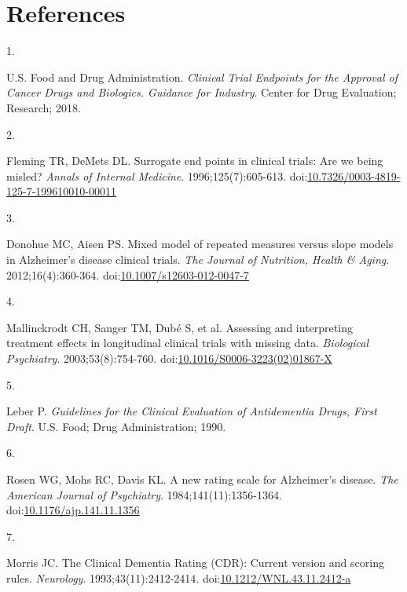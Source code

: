 \documentclass[
  11pt,
]{article}
\newlength{\cslhangindent}
\newlength{\csllabelwidth}
\newenvironment{CSLReferences}[2] %
 {\begin{list}{}{%
  \setlength{\itemindent}{0pt}
  \setlength{\leftmargin}{0pt}
  \setlength{\parsep}{0pt}
  \ifodd #1
   \setlength{\leftmargin}{\cslhangindent}
   \setlength{\itemindent}{-1\cslhangindent}
  \fi
  \setlength{\itemsep}{#2\baselineskip}}}
 {\end{list}}
\newcommand{\CSLLeftMargin}[1]{\parbox[t]{\csllabelwidth}{\strut#1\strut}}
\newcommand{\CSLRightInline}[1]{\parbox[t]{\linewidth - \csllabelwidth}{\strut#1\strut}}
\begin{document}
\section*{References}\label{references}

\protect{}\label{refs}
\begin{CSLReferences}{0}{1}
\CSLLeftMargin{1. }%
\CSLRightInline{U.S. Food and Drug Administration. \emph{Clinical Trial Endpoints for the Approval of Cancer Drugs and Biologics. Guidance for Industry}. Center for Drug Evaluation; Research; 2018.}

\CSLLeftMargin{2. }%
\CSLRightInline{Fleming TR, DeMets DL. Surrogate end points in clinical trials: Are we being misled? \emph{Annals of Internal Medicine}. 1996;125(7):605-613. doi:\href{https://doi.org/10.7326/0003-4819-125-7-199610010-00011}{10.7326/0003-4819-125-7-199610010-00011}}

\CSLLeftMargin{3. }%
\CSLRightInline{Donohue MC, Aisen PS. Mixed model of repeated measures versus slope models in {Alzheimer's} disease clinical trials. \emph{The Journal of Nutrition, Health \& Aging}. 2012;16(4):360-364. doi:\href{https://doi.org/10.1007/s12603-012-0047-7}{10.1007/s12603-012-0047-7}}

\CSLLeftMargin{4. }%
\CSLRightInline{Mallinckrodt CH, Sanger TM, Dubé S, et al. Assessing and interpreting treatment effects in longitudinal clinical trials with missing data. \emph{Biological Psychiatry}. 2003;53(8):754-760. doi:\href{https://doi.org/10.1016/S0006-3223(02)01867-X}{10.1016/S0006-3223(02)01867-X}}

\CSLLeftMargin{5. }%
\CSLRightInline{Leber P. \emph{Guidelines for the Clinical Evaluation of Antidementia Drugs, First Draft}. U.S. Food; Drug Administration; 1990.}

\CSLLeftMargin{6. }%
\CSLRightInline{Rosen WG, Mohs RC, Davis KL. A new rating scale for {Alzheimer's} disease. \emph{The American Journal of Psychiatry}. 1984;141(11):1356-1364. doi:\href{https://doi.org/10.1176/ajp.141.11.1356}{10.1176/ajp.141.11.1356}}

\CSLLeftMargin{7. }%
\CSLRightInline{Morris JC. The {Clinical Dementia Rating} ({CDR}): Current version and scoring rules. \emph{Neurology}. 1993;43(11):2412-2414. doi:\href{https://doi.org/10.1212/WNL.43.11.2412-a}{10.1212/WNL.43.11.2412-a}}


\end{CSLReferences}
\end{document}
